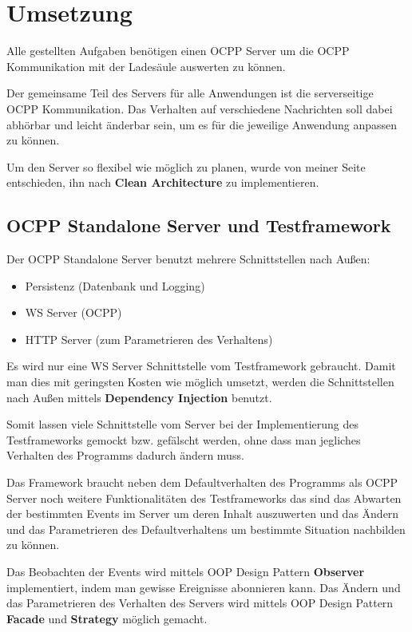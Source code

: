 
\section{Umsetzung}
Alle gestellten Aufgaben benötigen einen OCPP Server um die OCPP Kommunikation mit der Ladesäule auswerten zu können.

Der gemeinsame Teil des Servers für alle Anwendungen ist die serverseitige OCPP Kommunikation. 
Das Verhalten auf verschiedene Nachrichten soll dabei abhörbar und leicht änderbar sein, um es für die jeweilige Anwendung anpassen zu können.

Um den Server so flexibel wie möglich zu planen, wurde von meiner Seite entschieden, ihn nach \textbf{Clean Architecture} zu implementieren.
    \subsection{OCPP Standalone Server und Testframework}
    Der OCPP Standalone Server benutzt mehrere Schnittstellen nach Außen:
    \begin{itemize}
        \item Persistenz (Datenbank und Logging)
        \item WS Server (OCPP)
        \item HTTP Server (zum Parametrieren des Verhaltens)
    \end{itemize}

    Es wird nur eine WS Server Schnittstelle vom Testframework gebraucht.
    Damit man dies mit geringsten Kosten wie möglich umsetzt, werden die Schnittstellen nach Außen mittels \textbf{Dependency Injection} benutzt. 
    
    Somit lassen viele Schnittstelle vom Server bei der Implementierung des Testframeworks gemockt bzw. 
    gefälscht werden, ohne dass man jegliches Verhalten des Programms dadurch ändern muss.

    Das Framework braucht neben dem Defaultverhalten des Programms als OCPP Server noch weitere Funktionalitäten des Testframeworks das sind 
    das Abwarten der bestimmten Events im Server um deren Inhalt auszuwerten 
    und das Ändern und das Parametrieren des Defaultverhaltens um bestimmte Situation nachbilden zu können. 
    
    Das Beobachten der Events wird mittels OOP Design Pattern \textbf{Observer} implementiert, indem man gewisse Ereignisse abonnieren kann.
    Das Ändern und das Parametrieren des Verhalten des Servers wird mittels OOP Design Pattern \textbf{Facade} und \textbf{Strategy} möglich gemacht.

